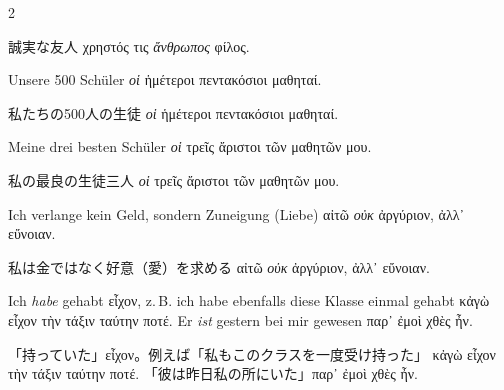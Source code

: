 \begin{paracol}{2}
\begin{enumerate}[leftmargin=0pt,rightmargin=0pt,listparindent =1cm,labelindent=1cm,labelsep=1ex,labelwidth={*},itemindent={*},align=left]
\begin{japanese}
誠実な友人 \textgreek[variant=ancient]{χρηστός τις \emph{ἄνθρωπος} φίλος.}
\end{japanese}
\switchcolumn*

\begin{german}
\item Unsere 500 Schüler \textgreek[variant=ancient]{\emph{οἱ} ἡμέτεροι
πεντακόσιοι μαθηταί.}
\end{german}
\switchcolumn

\begin{japanese}
私たちの500人の生徒 \textgreek[variant=ancient]{\emph{οἱ} ἡμέτεροι πεντακόσιοι μαθηταί.}
\end{japanese}
\switchcolumn*

\begin{german}
\begin{continuousitemline}Meine drei besten Schüler \textgreek[variant=ancient]{\emph{οἱ}
τρεῖς ἄριστοι τῶν μαθητῶν μου.}\par\end{continuousitemline}
\end{german}
\switchcolumn

\begin{japanese}
私の最良の生徒三人 \textgreek[variant=ancient]{\emph{οἱ} τρεῖς ἄριστοι τῶν μαθητῶν μου.}
\end{japanese}
\switchcolumn*

\begin{german}
\item Ich verlange kein Geld, sondern Zuneigung (Liebe) \textgreek[variant=ancient]{αἰτῶ
\emph{οὐκ} ἀργύριον, ἀλλ᾽ εὔνοιαν.}
\end{german}
\switchcolumn

\begin{japanese}
私は金ではなく好意（愛）を求める \textgreek[variant=ancient]{αἰτῶ \emph{οὐκ} ἀργύριον, ἀλλ᾽ εὔνοιαν.}
\end{japanese}
\switchcolumn*

\begin{german}
\item Ich \emph{habe} gehabt \textgreek[variant=ancient]{εἶχον,} z.\,B.
ich habe ebenfalls diese Klasse einmal gehabt \textgreek[variant=ancient]{κἀγὼ
εἶχον τὴν τάξιν ταύτην ποτέ.} Er \emph{ist} gestern bei mir gewesen
\textgreek[variant=ancient]{παρ᾽ ἐμοὶ χθὲς ἦν.}
\end{german}
\switchcolumn

\begin{japanese}
「持っていた」\textgreek[variant=ancient]{εἶχον}。例えば「私もこのクラスを一度受け持った」
\textgreek[variant=ancient]{κἀγὼ εἶχον τὴν τάξιν ταύτην ποτέ.}
「彼は昨日私の所にいた」\textgreek[variant=ancient]{παρ᾽ ἐμοὶ χθὲς ἦν.}
\end{japanese}
\switchcolumn*


\end{enumerate}
\end{paracol}
